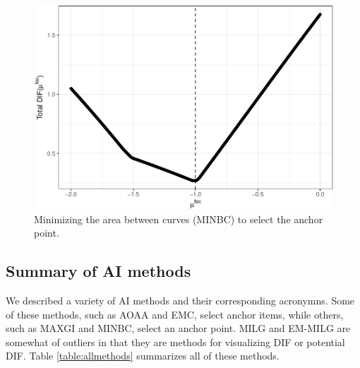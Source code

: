 \documentclass[
  11pt,
]{article}
\begin{document}
\begin{figure}[H]

{\centering \includegraphics[width=0.7\linewidth]{paper_files/figure-latex/mabc-1} 

}

\caption{Minimizing the area between curves (MINBC) to select the anchor point.}\label{fig:mabc}
\end{figure}

\hypertarget{summary-of-ai-methods}{%
\subsection{Summary of AI methods}\label{summary-of-ai-methods}}

We described a variety of AI methods and their corresponding acronymns. Some of these methods, such as AOAA and EMC, select anchor items, while others, such as MAXGI and MINBC, select an anchor point. MILG and EM-MILG are somewhat of outliers in that they are methods for visualizing DIF or potential DIF. Table \ref{table:allmethods} summarizes all of these methods.
\end{document}
